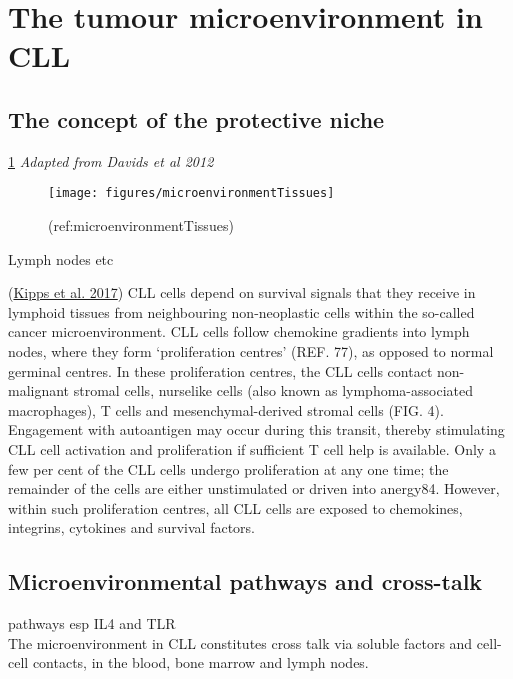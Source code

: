 \documentclass[11pt, a4paper, twosided]{book}
\begin{document}
\hypertarget{the-tumour-microenvironment-in-cll}{%
\section{The tumour microenvironment in CLL}\label{the-tumour-microenvironment-in-cll}}

\hypertarget{the-concept-of-the-protective-niche}{%
\subsection{The concept of the protective niche}\label{the-concept-of-the-protective-niche}}

\ref{fig:microenvironmentTissues} \emph{Adapted from Davids et al 2012}
\begin{figure}

{\centering \texttt{[image: figures/microenvironmentTissues]} 

}

\caption{(ref:microenvironmentTissues)}\label{fig:microenvironmentTissues}
\end{figure}
Lymph nodes etc

(\protect\hyperlink{ref-Kipps2017}{Kipps et al. 2017})
CLL cells depend on survival signals that they receive in lymphoid tissues from neighbouring non-neoplastic cells within the so-called cancer microenvironment. CLL cells follow chemokine gradients into lymph nodes, where they form `proliferation centres' (REF. 77), as opposed to normal germinal centres. In these proliferation centres, the CLL cells contact non- malignant stromal cells, nurselike cells (also known as lymphoma-associated macrophages), T cells and mesenchymal-derived stromal cells (FIG. 4). Engagement with autoantigen may occur during this transit, thereby stimulating CLL cell activation and proliferation if sufficient T cell help is available. Only a few per cent of the CLL cells undergo proliferation at any one time; the remainder of the cells are either unstimulated or driven into anergy84. However, within such proliferation centres, all CLL cells are exposed to chemokines, integrins, cytokines and survival factors.

\hypertarget{microenvironmental-pathways-and-cross-talk}{%
\subsection{Microenvironmental pathways and cross-talk}\label{microenvironmental-pathways-and-cross-talk}}

pathways esp IL4 and TLR\\
The microenvironment in CLL constitutes cross talk via soluble factors and cell-cell contacts, in the blood, bone marrow and lymph nodes.
\end{document}
